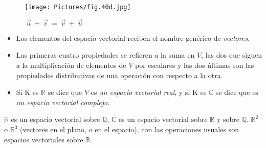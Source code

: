 \begin{figure}
    \centering
    \label{fig:my_label}
\end{figure}
\begin{figure}
    \centering
\end{figure}



\begin{figure}
    \centering
    \texttt{[image: Pictures/fig.40d.jpg]}
   \caption{$~\vec{u}~ + ~\vec{v}~ = ~\vec{v}~ + ~\vec{u}~$}
    \label{fig:suma}
\end{figure}

\bigskip


\bigskip

\bigskip

\begin{remark} 
\begin{itemize}

\item 

Los elementos del espacio vectorial reciben el nombre genérico de \textit{vectores}.
\item 
Las primeras cuatro propiedades se refieren a la suma en $V$, las dos que siguen a la multiplicación de elementos de $V$  por escalares y las dos últimas son las propiedades distributivas de una operación con respecto a la otra.
\item 
Si K es $\mathbb{R}$ se dice que $V$ es \textit{un espacio vectorial real}, y si K es  $\mathbb{C}$ se dice que es \textit{un espacio vectorial complejo}.
\end{itemize}
\end{remark}


\begin{example}
$\mathbb{R}$ es un espacio vectorial sobre $\mathbb{Q}$, $\mathbb{C}$ es un espacio vectorial sobre $\mathbb{R}$ y  sobre $\mathbb{Q}$.
$\mathbb{R}^{2}$ o $\mathbb{R}^{3}$ (vectores en el plano, o en el espacio), con las operaciones usuales son espacios vectoriales sobre $\mathbb{R}$.
\end{example}


